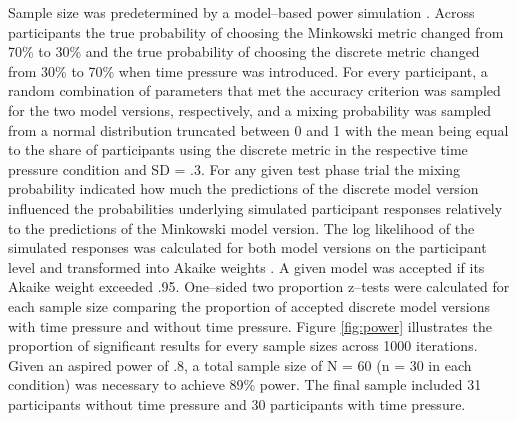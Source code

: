 \documentclass[a4paper,man,natbib]{apa6}
\begin{document}
Sample size was predetermined by a model--based power simulation \citep{gluth2019importance}. Across participants the true probability of choosing the Minkowski metric changed from 70\% to 30\% and the true probability of choosing the discrete metric changed from 30\% to 70\% when time pressure was introduced. For every participant, a random combination of parameters that met the accuracy criterion was sampled for the two model versions, respectively, and a mixing probability was sampled from a normal distribution truncated between 0 and 1 with the mean being equal to the share of participants using the discrete metric in the respective time pressure condition and SD =  .3. For any given test phase trial the mixing probability indicated how much the predictions of the discrete model version influenced the probabilities underlying simulated participant responses relatively to the predictions of the Minkowski model version. The log likelihood of the simulated responses was calculated for both model versions on the participant level and transformed into Akaike weights \citep{wagenmakers2004aic}. A given model was accepted if its Akaike weight exceeded .95. One--sided two proportion z--tests were calculated for each sample size comparing the proportion of accepted discrete model versions with time pressure and without time pressure. Figure \ref{fig:power} illustrates the proportion of significant results for every sample sizes across 1000 iterations. Given an aspired power of .8, a total sample size of N = 60 (n = 30 in each condition) was necessary to achieve 89\% power. The final sample included 31 participants without time pressure and 30 participants with time pressure.
\end{document}
